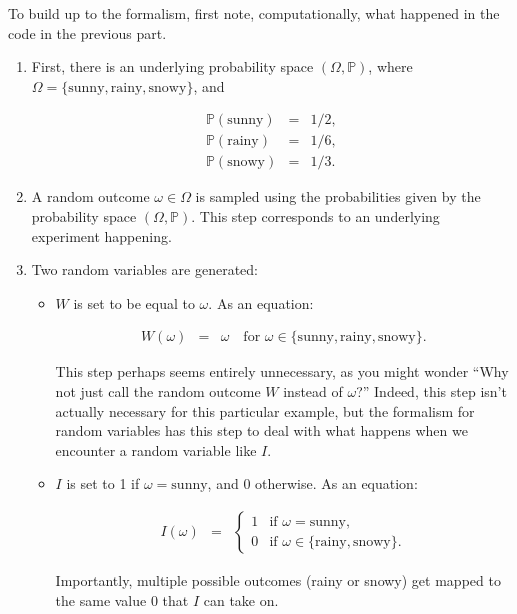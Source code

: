 \documentclass[6008notes.tex]{subfiles}
\begin{document}
To build up to the formalism, first note, computationally, what happened in the code in the previous part.

\begin{enumerate}
\item First, there is an underlying probability space $(\Omega , \mathbb {P})$, where $\Omega = \{ \text {sunny}, \text {rainy}, \text {snowy}\}$, and

\begin{eqnarray}
\mathbb{P}(\text{sunny}) &=& 1/2, \\
\mathbb{P}(\text{rainy}) &=& 1/6, \\
\mathbb{P}(\text{snowy}) &=& 1/3.
\end{eqnarray}

\item A random outcome $\omega \in \Omega$ is sampled using the probabilities given by the probability space $(\Omega , \mathbb {P})$. This step corresponds to an underlying experiment happening.

\item Two random variables are generated:

\begin{itemize}
\item $W$ is set to be equal to $\omega$. As an equation:

\begin{eqnarray}
W(\omega) &=&\omega\quad\text{for }\omega\in\{\text{sunny},\text{rainy},\text{snowy}\}.
\end{eqnarray}

This step perhaps seems entirely unnecessary, as you might wonder ``Why not just call the random outcome $W$ instead of $\omega$?'' Indeed, this step isn't actually necessary for this particular example, but the formalism for random variables has this step to deal with what happens when we encounter a random variable like $I$.

\item $I$ is set to 1 if $\omega =\text {sunny}$, and 0 otherwise. As an equation:

\begin{eqnarray}
I(\omega)
&=&
\begin{cases}
  1 & \text{if }\omega=\text{sunny}, \\
  0 & \text{if }\omega\in\{\text{rainy},\text{snowy}\}.
\end{cases}
\end{eqnarray}

Importantly, multiple possible outcomes (rainy or snowy) get mapped to the same value 0 that $I$ can take on.
\end{itemize}
\end{enumerate}
\end{document}
